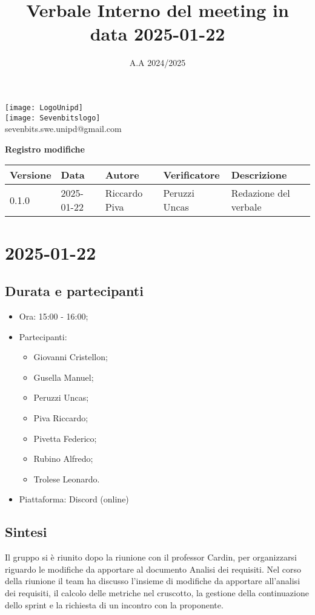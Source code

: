 \documentclass[10pt]{article}
\title{Verbale Interno del meeting in data 2025-01-22}
\date{A.A 2024/2025}
\begin{document}
\maketitle
\begin{center}
\texttt{[image: LogoUnipd]}\\
\texttt{[image: Sevenbitslogo]}\\
sevenbits.swe.unipd@gmail.com\\
\vspace{2mm}

\textbf{Registro modifiche}\\
\vspace{2mm}
\begin{tabularx}{\textwidth}{|l|l|l|l|X|}
\hline
\textbf{Versione} & \textbf{Data} & \textbf{Autore} & \textbf{Verificatore} & \textbf{Descrizione} \\
\hline
0.1.0 & 2025-01-22 & Riccardo Piva & Peruzzi Uncas & Redazione del verbale \\
\hline
\end{tabularx}
\end{center}

\newpage
\tableofcontents
\newpage
\section{2025-01-22}
\subsection{Durata e partecipanti}
\begin{itemize}
\item Ora: 15:00 - 16:00;
\item Partecipanti:
	\begin{itemize}
    	\item Giovanni Cristellon;
		\item Gusella Manuel;
		\item Peruzzi Uncas;
		\item Piva Riccardo;
		\item Pivetta Federico;
		\item Rubino Alfredo;
		\item Trolese Leonardo.
	\end{itemize}
\item Piattaforma: Discord (online)
\end{itemize}

\subsection{Sintesi}
Il gruppo si è riunito dopo la riunione con il professor Cardin, per organizzarsi riguardo le modifiche da apportare al documento Analisi dei requisiti.
Nel corso della riunione il team ha discusso l'insieme di modifiche da apportare all'analisi dei requisiti, il calcolo delle metriche nel cruscotto, la gestione della continuazione dello sprint e la richiesta di un incontro con la proponente.
\end{document}
